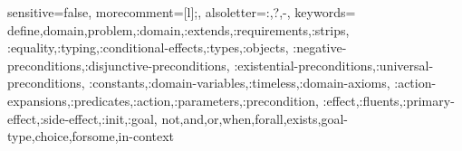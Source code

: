 {
  sensitive=false,    %
  morecomment=[l]{;}, %
  alsoletter={:,?,-}, %
  keywords={
    define,domain,problem,:domain,:extends,:requirements,:strips,
    :equality,:typing,:conditional-effects,:types,:objects,
    :negative-preconditions,:disjunctive-preconditions,
    :existential-preconditions,:universal-preconditions,
    :constants,:domain-variables,:timeless,:domain-axioms,
    :action-expansions,:predicates,:action,:parameters,:precondition,
    :effect,:fluents,:primary-effect,:side-effect,:init,:goal,
    not,and,or,when,forall,exists,goal-type,choice,forsome,in-context
  }
}